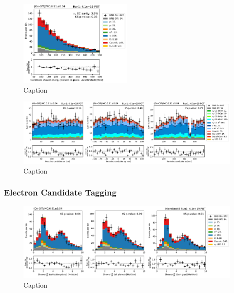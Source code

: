 \begin{figure}
    \centering
    \includegraphics[width=0.5\textwidth]{NueCCsel/Images/run1/pre_shower_E_pdg.pdf}
    \caption{Caption}
    \label{fig:pre_shower_E_pdg}
\end{figure}

\begin{figure}
    \centering
    \includegraphics[width=\textwidth]{NueCCsel/Images/run1/pre_vtx.pdf}
    \caption{Caption}
    \label{fig:pre_vtx}
\end{figure}


\subsubsection{Electron Candidate Tagging}

\begin{figure}
    \centering
    \includegraphics[width=\textwidth]{NueCCsel/Images/run1/e_cand_dedx.pdf}
    \caption{Caption}
    \label{fig:e_cand_dedx}
\end{figure}

